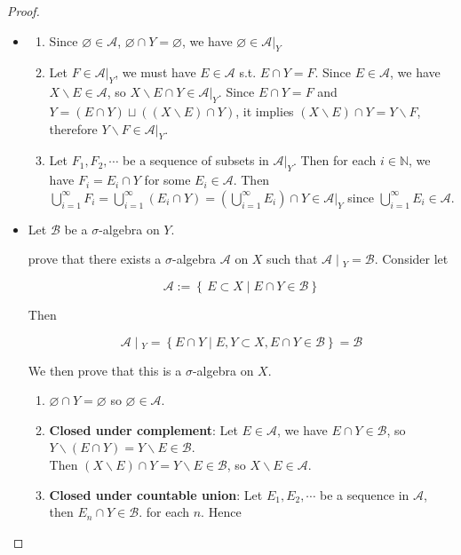 \begin{proof}

\begin{itemize}
\item
  \begin{enumerate}
  \item
    Since \(\varnothing \in \mathcal{A}\), \(\varnothing \cap Y = \varnothing\), we have \(\varnothing \in \mathcal{A}|_{Y}\)
  \item
    Let \(F \in \mathcal{A}|_{Y}\), we must have \(E \in \mathcal{A}\) s.t. \(E \cap Y = F\). Since \(E \in \mathcal{A}\), we have \(X\backslash E \in \mathcal{A}\), so \(X\backslash E \cap Y \in \mathcal{A}|_{Y}\). Since \(E \cap Y = F\) and \(Y = (E \cap Y) \sqcup ((X\backslash E) \cap Y)\), it implies \((X\backslash E) \cap Y = Y\backslash F\), therefore \(Y\backslash F \in \mathcal{A}|_{Y}\).
  \item
    Let \(F_{1},F_{2},\cdots\) be a sequence of subsets in \(\mathcal{A}|_{Y}\). Then for each \(i \in \mathbb{N}\), we have \(F_{i} = E_{i} \cap Y\) for some \(E_{i} \in \mathcal{A}\). Then \(\bigcup_{i = 1}^{\infty}F_{i} = \bigcup_{i = 1}^{\infty}(E_{i} \cap Y) = (\bigcup_{i = 1}^{\infty}E_{i}) \cap Y \in \mathcal{A}|_{Y}\) since \(\bigcup_{i = 1}^{\infty}E_{i} \in \mathcal{A}\).
  \end{enumerate}
\item
  Let \(\mathcal{B}\) be a \(\sigma\)-algebra on \(Y\).

  prove that there exists a \(\sigma\)-algebra \(\mathcal{A}\) on \(X\) such that \(\left. \mathcal{A} \middle| {}_{Y} = \mathcal{B} \right.\). Consider let

  \[\mathcal{A} := \left\{ {\, E \subset X \mid E \cap Y \in \mathcal{B}} \right\}\]

  Then

  \[\left. \mathcal{A} \middle| {}_{Y} = \left\{ {E \cap Y \mid E,Y \subset X,E \cap Y \in \mathcal{B}} \right\} = \mathcal{B} \right.\]

  We then prove that this is a \(\sigma\)-algebra on \(X\).\\

  \begin{enumerate}
  \item
    \(\varnothing \cap Y = \varnothing\) so \(\varnothing \in \mathcal{A}\).
  \item
    \textbf{Closed under complement}: Let \(E \in \mathcal{A}\), we have \(E \cap Y \in \mathcal{B}\), so \(Y\backslash(E \cap Y) = Y\backslash E \in \mathcal{B}\).\\
    Then \((X\backslash E) \cap Y = Y\backslash E \in \mathcal{B}\), so \(X\backslash E \in \mathcal{A}\).
  \item
    \textbf{Closed under countable union}: Let \(E_{1},E_{2},\cdots\) be a sequence in \(\mathcal{A}\), then \(E_{n} \cap Y \in \mathcal{B}\). for each \(n\). Hence


\end{enumerate}
\end{itemize}
\end{proof}
